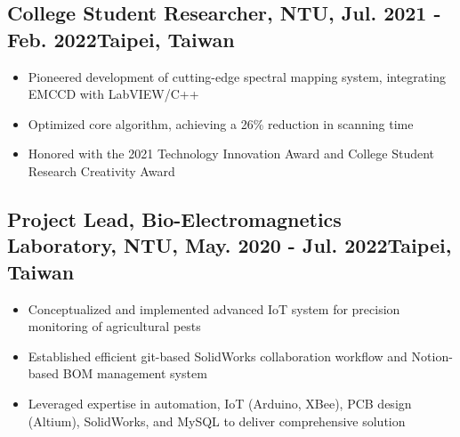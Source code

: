 \documentclass[12pt]{article}
\begin{document}
        \subsection*{College Student Researcher, NTU, Jul. 2021 - Feb. 2022\hfill Taipei, Taiwan}
        { \small
        \begin{itemize}
            \item Pioneered development of cutting-edge spectral mapping system, integrating EMCCD with LabVIEW/C++
            \item Optimized core algorithm, achieving a 26\% reduction in scanning time
            \item Honored with the 2021 Technology Innovation Award and College Student Research Creativity Award
        \end{itemize}}
        \subsection*{Project Lead, Bio-Electromagnetics Laboratory, NTU, May. 2020 - Jul. 2022\hfill Taipei, Taiwan}
        { \small
        \begin{itemize}
            \item Conceptualized and implemented advanced IoT system for precision monitoring of agricultural pests
            \item Established efficient git-based SolidWorks collaboration workflow and Notion-based BOM management system
            \item Leveraged expertise in automation, IoT (Arduino, XBee), PCB design (Altium), SolidWorks, and MySQL to deliver comprehensive solution
        \end{itemize}
        }
        
\end{document}
